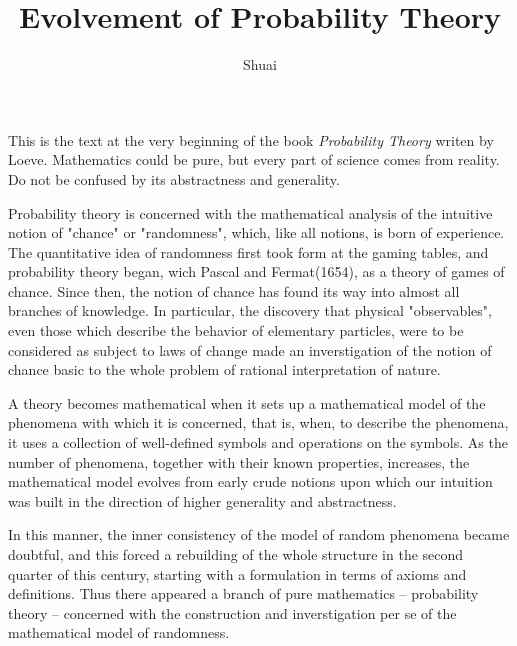 \documentclass[a4paper]{article}
\title{Evolvement of Probability Theory}
\author{Shuai}
\date{}
\begin{document}
\maketitle

This is the text at the very beginning of the book \textit{Probability Theory} writen
by Loeve. Mathematics could be pure, but every part of science comes from
reality. Do not be confused by its abstractness and generality.

Probability theory is concerned with the mathematical analysis of the intuitive
notion of "chance" or "randomness", which, like all notions, is born of
experience. The quantitative idea of randomness first took form at the gaming
tables, and probability theory began, wich Pascal and Fermat(1654), as a theory
of games of chance. Since then, the notion of chance has found its way into
almost all branches of knowledge. In particular, the discovery that physical
"observables", even those which describe the behavior of elementary particles,
were to be considered as subject to laws of change made an inverstigation of
the notion of chance basic to the whole problem of rational interpretation of
nature.

A theory becomes mathematical when it sets up a mathematical model of the
phenomena with which it is concerned, that is, when, to describe the phenomena,
it uses a collection of well-defined symbols and operations on the symbols. As
the number of phenomena, together with their known properties, increases, the
mathematical model evolves from early crude notions upon which our intuition
was built in the direction of higher generality and abstractness.

In this manner, the inner consistency of the model of random phenomena became
doubtful, and this forced a rebuilding of the whole structure in the second
quarter of this century, starting with a formulation in terms of axioms and
definitions. Thus there appeared a branch of pure mathematics -- probability
theory -- concerned with the construction and inverstigation per se of the
mathematical model of randomness.
\end{document}
